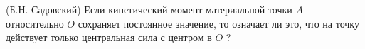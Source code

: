 (Б.Н. Садовский)
Если кинетический момент материальной точки $A$ относительно $O$
сохраняет постоянное значение, то означает ли это, что на точку
действует только центральная сила с центром в $O$ ?
